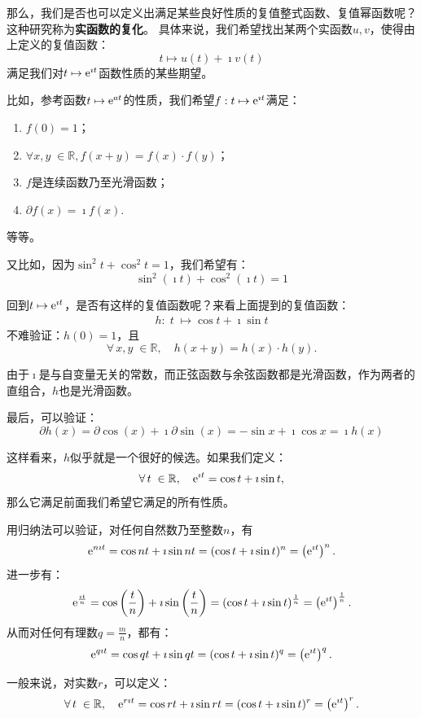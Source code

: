 \documentclass[12pt,UTF8]{ctexbook}
\begin{document}
那么，我们是否也可以定义出满足某些良好性质的复值整式函数、复值幂函数呢？这种研究称为\textbf{实函数的复化}。
具体来说，我们希望找出某两个实函数$u,v$，使得由上定义的复值函数：
$$ t\mapsto u(t) + \imath v(t)$$
满足我们对$t\mapsto \mathrm{e}^{\imath t}$函数性质的某些期望。

比如，参考函数$t\mapsto \mathrm{e}^{at}$的性质，我们希望$f: t\mapsto \mathrm{e}^{\imath t}$满足：
\begin{enumerate}
    \item $f(0) = 1$；
    \item $\forall x, y \; \in \mathbb{R}, f(x + y) = f(x)\cdot f(y)$；
    \item $f$是连续函数乃至光滑函数；
    \item $\partial f(x) = \imath f(x).$
\end{enumerate}
等等。

又比如，因为$\sin^2{t} + \cos^2{t} = 1$，我们希望有：
$$ \sin^2{(\imath t)} + \cos^2{(\imath t)} = 1 $$

回到$t\mapsto \mathrm{e}^{\imath t}$，是否有这样的复值函数呢？来看上面提到的复值函数：
\begin{align*}
    h: \;t \;\mapsto \cos{t} + \imath \sin{t}
\end{align*}
不难验证：$h(0) = 1$，且
$$ \forall \, x, y\; \in \mathbb{R}, \quad h(x + y) = h(x)\cdot h(y).$$

由于$\imath$是与自变量无关的常数，而正弦函数与余弦函数都是光滑函数，作为两者的直组合，$h$也是光滑函数。

最后，可以验证：
$$ \partial h(x) = \partial \cos{(x)} + \imath \partial \sin{(x)} = - \sin{x} + \imath \cos{x} = \imath h(x) $$

这样看来，$h$似乎就是一个很好的候选。如果我们定义：
$$ \forall \, t \; \in \mathbb{R}, \quad  \mathrm{e}^{\imath t} = \cos{t} + \imath \sin{t}, $$
那么它满足前面我们希望它满足的所有性质。

用归纳法可以验证，对任何自然数乃至整数$n$，有
$$ \mathrm{e}^{n\imath t} = \cos{nt} + \imath \sin{nt} = (\cos{t} + \imath \sin{t})^n = \left( \mathrm{e}^{\imath t} \right)^n. $$
进一步有：
$$ \mathrm{e}^{\frac{\imath t}{n}} = \cos{\left(\frac{t}{n}\right)} + \imath \sin{\left(\frac{t}{n}\right)} = (\cos{t} + \imath \sin{t})^{\frac{1}{n}} = \left( \mathrm{e}^{\imath t} \right)^{\frac{1}{n}}. $$
从而对任何有理数$q = \frac{m}{n}$，都有：
$$ \mathrm{e}^{q\imath t} = \cos{qt} + \imath \sin{qt} = (\cos{t} + \imath \sin{t})^q = \left( \mathrm{e}^{\imath t} \right)^q. $$

一般来说，对实数$r$，可以定义：
$$ \forall \, t \; \in \mathbb{R}, \quad \mathrm{e}^{r\imath t} = \cos{rt} + \imath \sin{rt} = (\cos{t} + \imath \sin{t})^r = \left( \mathrm{e}^{\imath t} \right)^r. $$
\end{document}
